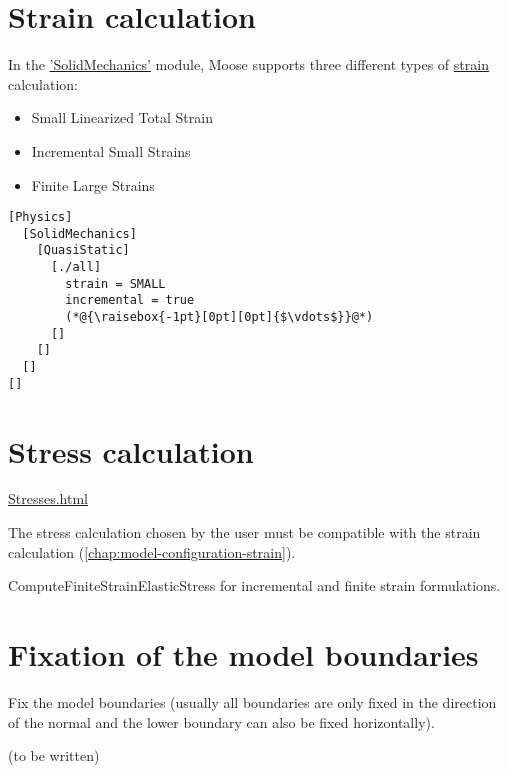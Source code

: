 \section{Strain calculation}
\label{chap:model-configuration-strain}

In the
\href{https://mooseframework.inl.gov/modules/solid_mechanics/}{'SolidMechanics'}
module, Moose supports three different types of
\href{https://mooseframework.inl.gov/modules/solid_mechanics/Strains.html}{strain}
calculation:
\begin{itemize}
  \item {Small Linearized Total Strain}
  \item {Incremental Small Strains}
  \item {Finite Large Strains}
\end{itemize}

\begin{lstlisting}[language=Moose, caption={Setting up incremental small strains within the Physics/SolidMechanics block},label={setup-incremental-small-strains}]
[Physics]
  [SolidMechanics]
    [QuasiStatic]
      [./all]
        strain = SMALL
        incremental = true
        (*@{\raisebox{-1pt}[0pt][0pt]{$\vdots$}}@*)
      []
    []
  []
[]
\end{lstlisting}

\section{Stress calculation}
\label{chap:model-configuration-stress}

\href{https://mooseframework.inl.gov/modules/solid_mechanics/Stresses.html}{Stresses.html}

The stress calculation chosen by the user must be compatible with the strain
calculation (\autoref{chap:model-configuration-strain}).

ComputeFiniteStrainElasticStress for incremental and finite strain
formulations.

\section{Fixation of the model boundaries}
\label{chap:model-configuration-boundary-fixities}

Fix the model boundaries (usually all boundaries are only fixed in the
direction of the normal and the lower boundary can also be fixed horizontally).

(to be written)